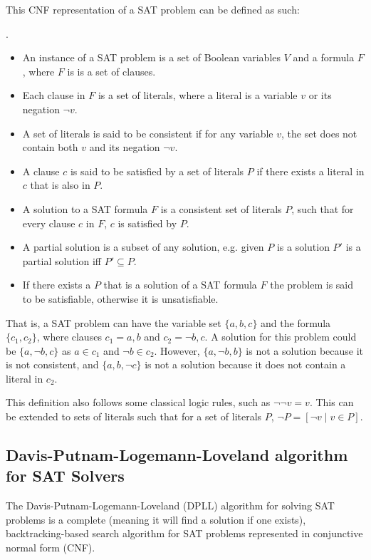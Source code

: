 This CNF representation of a SAT problem can be defined as such:
\begin{defs}
.
\begin{itemize}
\item An instance of a SAT problem is a set of Boolean variables $V$ and a formula $F$, where $F$ is is a set of clauses.
\item Each clause in $F$ is a set of literals, where a literal is a variable $v$ or its negation $\neg v$.
\item A set of literals is said to be consistent if for any variable $v$, the set does not contain both $v$ and its negation $\neg v$.
\item A clause $c$ is said to be satisfied by a set of literals $P$ if there exists a literal in $c$ that is also in $P$.
\item A solution to a SAT formula $F$ is a consistent set of literals $P$, such that for every clause $c$ in $F$, $c$ is satisfied by $P$.
\item A partial solution is a subset of any solution, e.g. given $P$ is a solution $P'$ is a partial solution iff $P' \subseteq P$.
\item If there exists a $P$ that is a solution of a SAT formula $F$ the problem is said to be satisfiable, otherwise it is unsatisfiable. 
\end{itemize}
\end{defs}

That is, a SAT problem can have the variable set $\{a,b,c\}$ and the formula $\{c_1,c_2\}$, where clauses $c_1 = {a,b}$ and $c_2 = {\neg b, c}$.
A solution for this problem could be $\{a,\neg b,c\}$ as $a \in c_1$ and $\neg b \in c_2$.
However, $\{a, \neg b, b\}$ is not a solution because it is not consistent, and $\{a, b, \neg c\}$ is not a solution because it does not contain a literal in $c_2$.  

This definition also follows some classical logic rules, such as $\neg \neg v = v$.
This can be extended to sets of literals such that for a set of literals $P$, $\neg P = [\neg v \mid v \in P]$.

\subsection{Davis-Putnam-Logemann-Loveland algorithm for SAT Solvers}
The Davis-Putnam-Logemann-Loveland (DPLL) algorithm \citep{Davis1960, davis1962machine} for solving SAT problems is a complete (meaning it will find a solution if one exists), 
backtracking-based search algorithm for SAT problems represented in conjunctive normal form (CNF).


